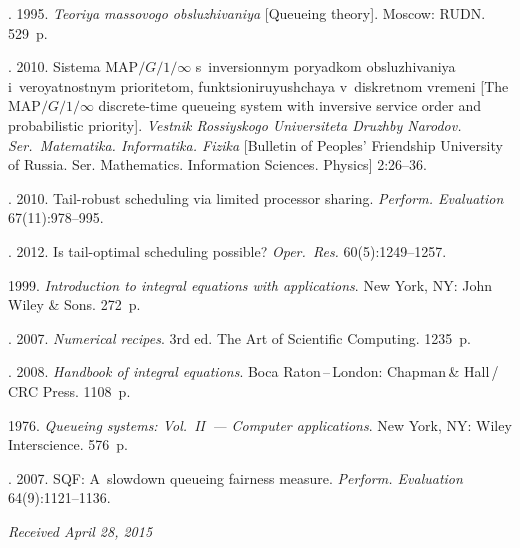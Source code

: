 \begin{multicols}{2}
{{\begin{thebibliography}{99}
. 1995.
\textit{Teoriya massovogo obsluzhivaniya} [Queueing theory].
Moscow: RUDN. 529~p.

. 2010.
Sis\-te\-ma MAP$/G/1/\infty$ s~inversionnym poryadkom
obsluzhivaniya i~veroyatnostnym prioritetom,
funk\-tsi\-o\-ni\-ru\-yushchaya v~diskretnom vremeni
[The MAP$/G/1/\infty$ discrete-time queueing
system with inversive service order and probabilistic
priority].
\textit{Vestnik Rossiyskogo Universiteta Druzhby
Narodov. Ser.\ Matematika. Informatika. Fizika}
[Bulletin of Peoples' Friendship University
of Russia. Ser. Mathematics. Information Sciences.
Physics] 2:26--36.

.
2010. Tail-robust scheduling via limited processor sharing.
\textit{Perform. Evaluation} 67(11):978--995.

.
2012. Is tail-optimal scheduling possible? \textit{Oper.\ Res.} 60(5):1249--1257.

 1999.
\textit{Introduction to integral equations with applications}.
 New York, NY: John Wiley \& Sons. 272~p.



. 2007.
\textit{Numerical recipes}. 3rd ed. The Art of Scientific Computing. 1235~p.

.
2008. \textit{Handbook of integral equations}.
 Boca Raton\,--\,London: Chapman\,\& Hall\,/\,CRC Press. 1108~p.

 1976. \textit{Queueing systems: Vol.~II~--- Computer applications}. New York, NY: Wiley Interscience. 576~p.

. 2007.
SQF: A~slowdown queueing fairness measure.
\textit{Perform. Evaluation} 64(9):1121--1136.
\end{thebibliography}

 }
 }

\end{multicols}

\vspace*{-3pt}

\hfill{\small\textit{Received April 28, 2015}}

